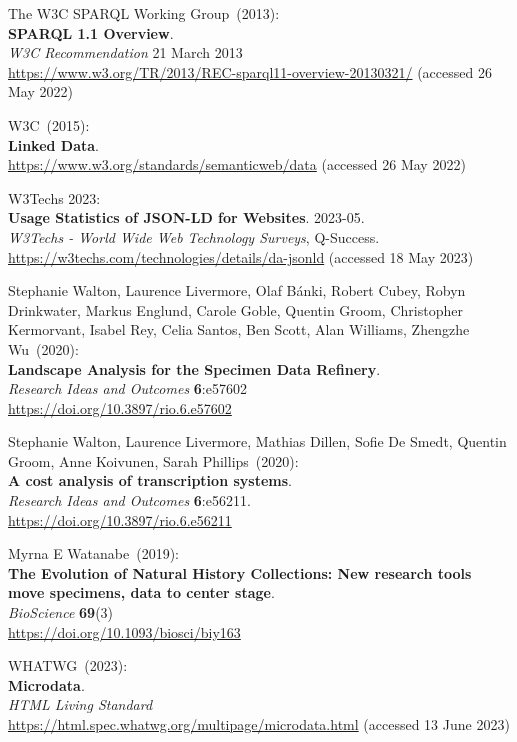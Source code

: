 \begin{thebibliography}{9}
The W3C SPARQL Working Group~(2013): \\
\textbf{{SPARQL} 1.1 {Overview}}. \\
\emph{W3C Recommendation} 21 March 2013 \\
\url{https://www.w3.org/TR/2013/REC-sparql11-overview-20130321/} (accessed 26 May 2022)

W3C~(2015): \\
\textbf{Linked Data}.\\
\url{https://www.w3.org/standards/semanticweb/data} (accessed 26 May 2022)

W3Techs 2023: \\
\textbf{Usage Statistics of JSON-LD for Websites}. 2023-05. \\
\emph{W3Techs - World Wide Web Technology Surveys}, Q-Success.\\
\url{https://w3techs.com/technologies/details/da-jsonld} (accessed 18
May 2023)

Stephanie Walton, Laurence Livermore, Olaf Bánki,
Robert Cubey, Robyn Drinkwater, Markus Englund, Carole Goble, Quentin
Groom, Christopher Kermorvant, Isabel Rey, Celia Santos, Ben Scott, Alan
Williams, Zhengzhe Wu~(2020): \\
\textbf{Landscape Analysis for the Specimen Data Refinery}.\\
\emph{Research Ideas and Outcomes} \textbf{6}:e57602\\
\url{https://doi.org/10.3897/rio.6.e57602}

Stephanie Walton, Laurence Livermore, Mathias Dillen, Sofie De Smedt, Quentin Groom, Anne Koivunen, Sarah Phillips~(2020): \\
\textbf{A cost analysis of transcription systems}. \\
\emph{Research Ideas and Outcomes} \textbf{6}:e56211.\\
\url{https://doi.org/10.3897/rio.6.e56211}

Myrna E Watanabe~(2019): \\
\textbf{The Evolution of Natural History Collections:
New research tools move specimens, data to center stage}.\\
\emph{BioScience} \textbf{69}(3)\\
\url{https://doi.org/10.1093/biosci/biy163}

WHATWG~(2023): \\
\textbf{Microdata}. \\
\emph{{HTML Living Standard}}\\
\url{https://html.spec.whatwg.org/multipage/microdata.html} (accessed 13
June 2023)



\end{thebibliography}
